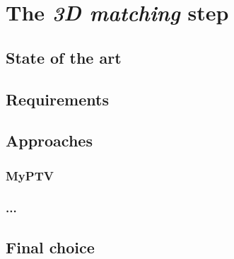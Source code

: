 \chapter{The \textit{3D matching} step}
\label{chap:matching}

\section{State of the art}
\section{Requirements}
\section{Approaches}
\subsection{MyPTV}
\subsection{...}
\section{Final choice}
